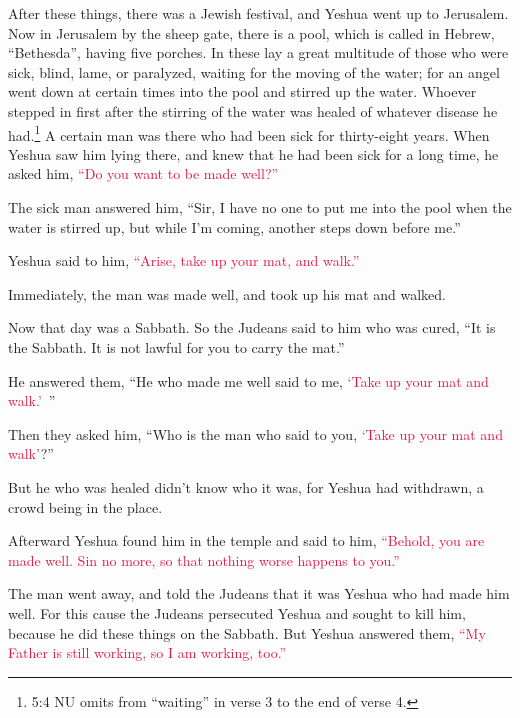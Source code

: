 \mychapter{} \myverse*{}After these things, there was a Jewish festival, and Yeshua went
up to Jerusalem.
\myverse{}Now in Jerusalem by the sheep gate, there is a pool, which is called in Hebrew,
“Bethesda”, having five porches.
\myverse{}In these lay a great multitude of those who were sick, blind, lame, or paralyzed,
waiting for the moving of the water;
\myverse{}for an angel went down at certain times into the pool and stirred up the water.
Whoever stepped in first after the stirring of the water was healed of whatever disease he had.\footnote{5:4 NU omits from “waiting” in verse 3 to the end of verse 4.}
\myverse{}A certain man was there who had been sick for thirty-eight years.
\myverse{}When Yeshua saw him lying there, and knew that he had been sick for a long time,
he asked him,
\textcolor{crimson}{“Do you want to be made well?”}

\myverse{}The sick man answered him, “Sir, I have no one to put me into the
pool when the water is stirred up, but while I’m coming, another steps down before me.”

\myverse{}Yeshua said to him,
\textcolor{crimson}{“Arise, take up your mat, and walk.”}

\myverse{}Immediately, the man was made well, and took up his mat and walked.

Now that day was a Sabbath.
\myverse{}So the Judeans said to him who was cured, “It is the Sabbath. It is not lawful
for you to carry the mat.”

\myverse{}He answered them, “He who made me well said to me,
\textcolor{crimson}{‘Take up your mat and walk.’} ”

\myverse{}Then they asked him, “Who is the man who said to you,
\textcolor{crimson}{‘Take up your mat and walk’}?”

\myverse{}But he who was healed didn’t know who it was, for Yeshua had
withdrawn, a crowd being in the place.

\myverse{}Afterward Yeshua found him in the temple and said to him,
\textcolor{crimson}{“Behold, you are made well. Sin no more, so that nothing worse happens to you.”
}

\myverse{}The man went away, and told the Judeans that it was Yeshua who
had made him well.
\myverse{}For this cause the Judeans persecuted Yeshua and sought to kill him, because
he did these things on the Sabbath.
\myverse{}But Yeshua answered them,
\textcolor{crimson}{“My Father is still working, so I am working, too.”}

